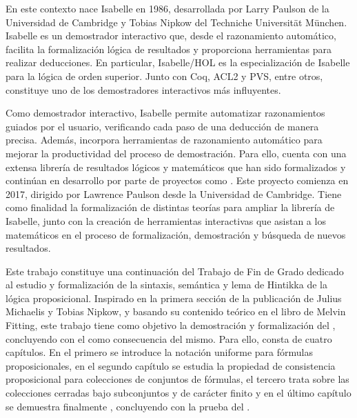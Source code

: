 \begin{isabellebody}
\begin{isamarkuptext}
  En este contexto nace Isabelle en 1986, desarrollada por Larry Paulson 
  de la Universidad de Cambridge y Tobias Nipkow del Techniche 
  Universität München. Isabelle es un demostrador interactivo que,
  desde el razonamiento automático, facilita la formalización lógica de 
  resultados y proporciona herramientas para realizar deducciones. En 
  particular, Isabelle/HOL es la especialización de Isabelle para la 
  lógica de orden superior. Junto con Coq, ACL2 y PVS, entre
  otros, constituye uno de los demostradores interactivos más 
  influyentes.

  Como demostrador interactivo, Isabelle permite automatizar 
  razonamientos guiados por el usuario, verificando cada paso de una 
  deducción de manera precisa. Además, incorpora herramientas de 
  razonamiento automático para mejorar la productividad del proceso de 
  demostración. Para ello, cuenta con una extensa librería de resultados 
  lógicos y matemáticos que han sido formalizados y continúan en 
  desarrollo por parte de proyectos como . Este proyecto 
  comienza en 2017, dirigido por Lawrence Paulson desde la Universidad 
  de Cambridge. Tiene como finalidad la formalización de distintas 
  teorías para ampliar la librería de Isabelle, junto con la creación de 
  herramientas interactivas que asistan a los matemáticos en el proceso 
  de formalización, demostración y búsqueda de nuevos resultados. 

  Este trabajo constituye una continuación del Trabajo de Fin de Grado
    dedicado al estudio
  y formalización de la sintaxis, semántica y lema de Hintikka de la lógica
  proposicional. Inspirado en la primera sección de la publicación 
    de Julius Michaelis y Tobias Nipkow, y
  basando su contenido teórico en el libro   de Melvin Fitting, este trabajo tiene como objetivo la
  demostración y formalización del , concluyendo
  con el  como consecuencia del mismo. Para ello, consta
  de cuatro capítulos. En el primero se introduce la notación uniforme para 
  fórmulas proposicionales, en el segundo capítulo se estudia la propiedad de 
  consistencia proposicional para colecciones de conjuntos de fórmulas, el 
  tercero trata sobre las colecciones cerradas bajo subconjuntos y de carácter 
  finito y en el último capítulo se demuestra finalmente , concluyendo con la prueba del .


\end{isamarkuptext}
\end{isabellebody}
